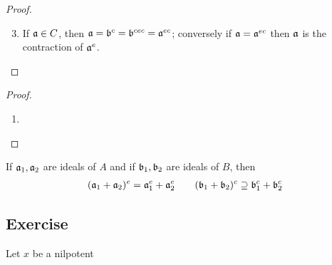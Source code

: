 \documentclass[11pt]{article}
\begin{document}
\begin{proof}
\begin{enumerate}
\setcounter{enumi}{2}
\item If \(\mathfrak{a}\in C\), then \(\mathfrak{a}=\mathfrak{b}^c=\mathfrak{b}^{cec}=\mathfrak{a}^{ec}\); conversely if \(\mathfrak{a}=\mathfrak{a}^{ec}\) then \(\mathfrak{a}\) is the
contraction of \(\mathfrak{a}^e\).
\end{enumerate}
\end{proof}

\begin{proof}
\begin{enumerate}
\item 
\end{enumerate}
\end{proof}

\begin{exercise}
If \(\mathfrak{a}_1,\mathfrak{a}_2\) are ideals of \(A\) and if \(\mathfrak{b}_1,\mathfrak{b}_2\) are ideals of \(B\), then
\begin{alignat*}{2}
&(\mathfrak{a}_1+\mathfrak{a}_2)^e=\mathfrak{a}_1^e+\mathfrak{a}_2^e\quad&&(\mathfrak{b}_1+\mathfrak{b}_2)^c\supseteq\mathfrak{b}_1^c+\mathfrak{b}_2^c\\
\end{alignat*}
\end{exercise}
\subsection{Exercise}
\label{sec:orgcdee8bd}
\begin{exercise}
\label{ex1.1}
Let \(x\) be a nilpotent 
\end{exercise}
\end{document}
